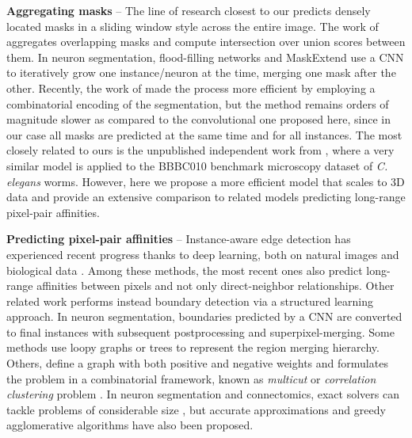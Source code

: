 \textbf{Aggregating \maskname masks} -- 
The line of research closest to our predicts densely located \maskname masks in a sliding window style across the entire image. The work of \cite{liu2016multi} aggregates overlapping masks and compute intersection over union scores between them.
In neuron segmentation, flood-filling networks \cite{januszewski2018high} and MaskExtend \cite{meirovitch2016multi} use a CNN to iteratively grow one instance/neuron at the time, merging one mask after the other. Recently, the work of \cite{meirovitch2019cross} made the process more efficient by employing a combinatorial encoding of the segmentation, but the method remains orders of magnitude slower as compared to the convolutional one proposed here, since in our case all masks are predicted at the same time and for all instances.
The most closely related to ours is the unpublished independent work from \cite{hirsch2020patchperpix}, where a very similar model is applied to the BBBC010 benchmark microscopy dataset of \emph{C. elegans} worms. However, here we propose a more efficient model that scales to 3D data and provide an extensive comparison to related models predicting long-range pixel-pair affinities. 

\textbf{Predicting pixel-pair affinities} --  
Instance-aware edge detection has experienced recent progress thanks to deep learning, both on natural images \cite{Gao_2019_ICCV,liu2018affinity,kirillov2017instancecut,xie2015holistically,kokkinos2015pushing} and biological data \cite{lee2017superhuman,wolf2018mutex,schmidt2018cell,zeng2017deepem3d,parag2017anisotropic,bailoni2019generalized,meirovitch2016multi,ciresan2012deep}. Among these methods, the most recent ones also predict long-range affinities between pixels and not only direct-neighbor relationships.
Other related work \cite{funke2018large,turaga2009maximin} performs instead boundary detection via a structured learning approach.
In neuron segmentation, boundaries predicted by a CNN are converted to final instances with subsequent postprocessing and superpixel-merging.
Some methods use loopy graphs \cite{kaynig2015large,krasowski2015improving} or trees \cite{meirovitch2016multi,liu2016sshmt,liu2014modular,funke2015learning,uzunbas2016efficient,nunez2013machine,knowles2016rhoananet} to represent the region merging hierarchy. 
Others, define a graph with both positive and negative weights and formulates the problem in a combinatorial framework, known as \emph{multicut} or \emph{correlation clustering} problem \cite{kappes2011globally,chopra1991multiway,beier2017multicut}. 
In neuron segmentation and connectomics, exact solvers can tackle problems of considerable size \cite{andres2012globally}, but accurate approximations \cite{pape2017solving,beier2017multicut,beier2016efficient,yarkony2012fast,beier2014cut} and greedy agglomerative algorithms \cite{levinkov2017comparative,wolf2019mutex,bailoni2019generalized} have also been proposed.



